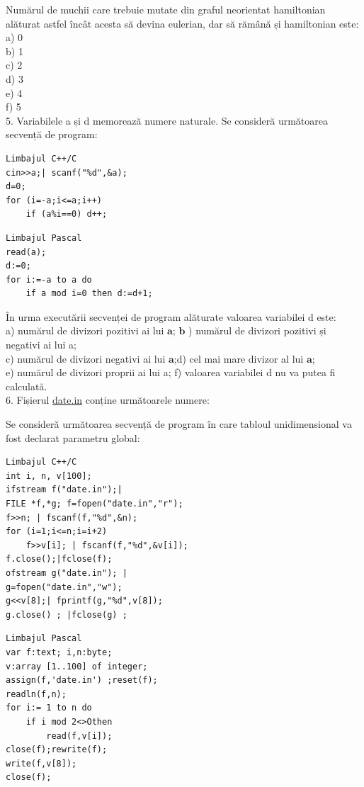 \documentclass[10pt]{article}
\begin{document}
Numărul de muchii care trebuie mutate din graful neorientat hamiltonian alăturat astfel încât acesta să devina eulerian, dar să rămână și hamiltonian este:\\
a) 0\\
b) 1\\
c) 2\\
d) 3\\
e) 4\\
f) 5\\
5. Variabilele a și d memorează numere naturale. Se consideră următoarea secvență de program:

\begin{verbatim}
Limbajul C++/C
cin>>a;| scanf("%d",&a);
d=0;
for (i=-a;i<=a;i++)
    if (a%i==0) d++;
\end{verbatim}

\begin{verbatim}
Limbajul Pascal
read(a);
d:=0;
for i:=-a to a do
    if a mod i=0 then d:=d+1;
\end{verbatim}

În urma executării secvenței de program alăturate valoarea variabilei d este:\\
a) numărul de divizori pozitivi ai lui $\mathbf{a}$; $\mathbf{b}$ ) numărul de divizori pozitivi și negativi ai lui a;\\
c) numărul de divizori negativi ai lui $\mathbf{a}$;d) cel mai mare divizor al lui $\mathbf{a}$;\\
e) numărul de divizori proprii ai lui a; f) valoarea variabilei d nu va putea fi calculată.\\
6. Fișierul \href{http://date.in}{date.in} conține următoarele numere:

Se consideră următoarea secvență de program în care tabloul unidimensional va fost declarat parametru global:

\begin{verbatim}
Limbajul C++/C
int i, n, v[100];
ifstream f("date.in");|
FILE *f,*g; f=fopen("date.in","r");
f>>n; | fscanf(f,"%d",&n);
for (i=1;i<=n;i=i+2)
    f>>v[i]; | fscanf(f,"%d",&v[i]);
f.close();|fclose(f);
ofstream g("date.in"); |
g=fopen("date.in","w");
g<<v[8];| fprintf(g,"%d",v[8]);
g.close() ; |fclose(g) ;
\end{verbatim}

\begin{verbatim}
Limbajul Pascal
var f:text; i,n:byte;
v:array [1..100] of integer;
assign(f,'date.in') ;reset(f);
readln(f,n);
for i:= 1 to n do
    if i mod 2<>Othen
        read(f,v[i]);
close(f);rewrite(f);
write(f,v[8]);
close(f);
\end{verbatim}
\end{document}
